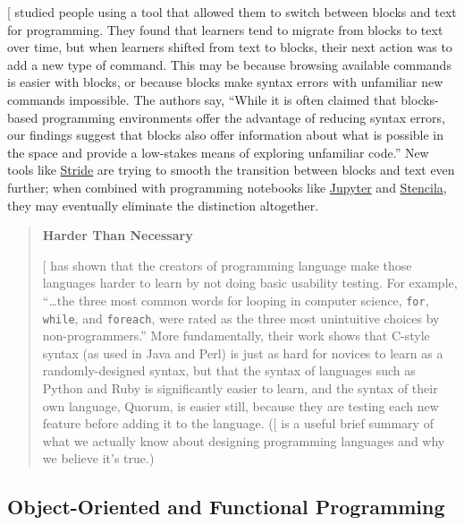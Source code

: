 {[}\protect[\hyperlink{b:Wein2017a}{Wein2017a}]{]} studied people using a tool that allowed them to
switch between blocks and text for programming. They found that
learners tend to migrate from blocks to text over time, but when
learners shifted from text to blocks, their next action was to add a
new type of command. This may be because browsing available commands
is easier with blocks, or because blocks make syntax errors with
unfamiliar new commands impossible. The authors say, ``While it is
often claimed that blocks-based programming environments offer the
advantage of reducing syntax errors, our findings suggest that blocks
also offer information about what is possible in the space and provide
a low-stakes means of exploring unfamiliar code.'' New tools like
\href{https://www.greenfoot.org/frames/}{Stride} are trying to smooth the transition between blocks
and text even further; when combined with programming notebooks like
\href{http://jupyter.org/}{Jupyter} and \href{http://stenci.la/}{Stencila}, they may eventually
eliminate the distinction altogether.

\begin{quote}\setlength{\parindent}{0pt}
\textbf{Harder Than Necessary}

{[}\protect[\hyperlink{b:Stef2013}{Stef2013}]{]} has shown that the creators of programming language
make those languages harder to learn by not doing basic usability
testing. For example, ``\ldots{}the three most common words for
looping in computer science, \texttt{for}, \texttt{while}, and \texttt{foreach}, were rated
as the three most unintuitive choices by non-programmers.'' More
fundamentally, their work shows that C-style syntax (as used in Java
and Perl) is just as hard for novices to learn as a randomly-designed
syntax, but that the syntax of languages such as Python and Ruby is
significantly easier to learn, and the syntax of their own language,
Quorum, is easier still, because they are testing each new feature
before adding it to the language. ({[}\protect[\hyperlink{b:Stef2017}{Stef2017}]{]} is a useful
brief summary of what we actually know about designing programming
languages and why we believe it's true.)
\end{quote}

\subsection{Object-Oriented and Functional Programming}\label{object-oriented-and-functional-programming}

